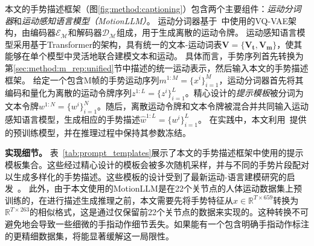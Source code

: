 本文的手势描述框架（图\ref{fig:method:captioning}）包含两个主要组件：\textit{运动分词器}和\textit{运动感知语言模型（MotionLLM）}。
运动分词器基于~\cite{guo2022tm2t,zhang2023t2mgpt}中使用的VQ-VAE架构，由编码器$\mathcal{E_M}$和解码器$\mathcal{D_M}$组成，用于生成离散的运动令牌。
运动感知语言模型采用基于Transformer的架构，具有统一的文本-运动词表$\mathbf{V} = \{\mathbf{V_t}, \mathbf{V_m}\}$，使其能够在单个模型中灵活地联合建模文本和运动。
具体而言，手势序列首先转换为第\ref{sec:method:m_rep:unified}节中描述的统一运动表示，然后输入本文的手势描述框架。
给定一个包含M帧的手势运动序列$m^{1:M}=\{x^i\}^M_{i=1}$，运动分词器首先将其编码和量化为离散的运动令牌序列$z^{1:L}=\{z^i\}^L_{i=1}$。精心设计的\textit{提示模板}被分词为文本令牌$w^{1:N}=\{w^i\}^N_{i=1}$。随后，离散运动令牌和文本令牌被混合并共同输入运动感知语言模型，生成相应的手势描述$\hat{w}^{1:L}=\{w^i\}^L_{i=1}$。
在实践中，本文利用~\cite{jiang2024motiongpt}提供的预训练模型，并在推理过程中保持其参数冻结。

\textbf{实现细节。}
表~\ref{tab:prompt_templates}展示了本文的手势描述框架中使用的提示模板集合。这些经过精心设计的模板会被多次随机采样，并与不同的手势片段配对以生成多样化的手势描述。这些模板的设计受到了最新运动-语言建模研究的启发~\cite{jiang2024motiongpt}。
此外，由于本文使用的MotionLLM是在22个关节点的人体运动数据集上预训练的，在进行描述生成推理之前，本文需要先将手势特征从$x\in \mathbb{R}^{T\times 659}$转换为$\mathbb{R}^{T\times 263}$的相似格式，这是通过仅保留前22个关节点的数据来实现的。这种转换不可避免地会导致一些细微的手指动作细节丢失。如果能有一个包含明确手指动作标注的更精细数据集，将能显著缓解这一局限性。

